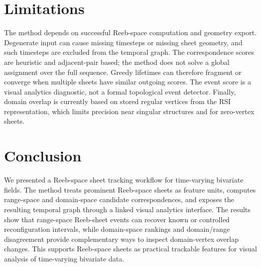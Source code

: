 \documentclass{vgtc}
\begin{document}
\section{Limitations}

The method depends on successful Reeb-space computation and geometry export. Degenerate input can cause missing timesteps or missing sheet geometry, and such timesteps are excluded from the temporal graph. The correspondence scores are heuristic and adjacent-pair based; the method does not solve a global assignment over the full sequence. Greedy lifetimes can therefore fragment or converge when multiple sheets have similar outgoing scores. The event score is a visual analytics diagnostic, not a formal topological event detector. Finally, domain overlap is currently based on stored regular vertices from the RSI representation, which limits precision near singular structures and for zero-vertex sheets.

\section{Conclusion}

We presented a Reeb-space sheet tracking workflow for time-varying bivariate fields. The method treats prominent Reeb-space sheets as feature units, computes range-space and domain-space candidate correspondences, and exposes the resulting temporal graph through a linked visual analytics interface. The results show that range-space Reeb-sheet events can recover known or controlled reconfiguration intervals, while domain-space rankings and domain/range disagreement provide complementary ways to inspect domain-vertex overlap changes. This supports Reeb-space sheets as practical trackable features for visual analysis of time-varying bivariate data.

\acknowledgments{}



\end{document}
